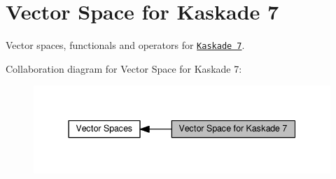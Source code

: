 \hypertarget{group__KaskadeGroup}{}\section{Vector Space for Kaskade 7}
\label{group__KaskadeGroup}


Vector spaces, functionals and operators for \href{http://www.zib.de/projects/kaskade7-finite-element-toolbox}{\tt Kaskade 7}.  


Collaboration diagram for Vector Space for Kaskade 7\+:\nopagebreak
\begin{figure}[H]
\begin{center}
\leavevmode
\includegraphics[width=337pt]{group__KaskadeGroup}
\end{center}
\end{figure}
